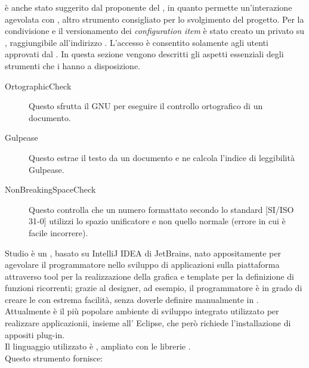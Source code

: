 		 è anche stato suggerito dal proponente del , in quanto permette un'interazione agevolata con , altro strumento consigliato per lo svolgimento del progetto. 
			Per la condivisione e il versionamento dei \textit{configuration item} è stato creato un  privato su , raggiungibile all’indirizzo . L’accesso è consentito solamente agli utenti approvati dal .
		In questa sezione vengono descritti gli aspetti essenziali degli strumenti che i  hanno a disposizione.
		\begin{description}
			\item[OrtographicCheck] Questo  sfrutta il  GNU  per eseguire il controllo ortografico di un documento.
			\item[Gulpease] Questo  estrae il testo da un documento e ne calcola l'indice di leggibilità Gulpease.
			\item[NonBreakingSpaceCheck] Questo  controlla che un numero formattato secondo lo standard [SI/ISO 31-0] utilizzi lo spazio unificatore e non quello normale (errore in cui è facile incorrere).
		\end{description}
		 Studio è un , basato su IntelliJ IDEA di JetBrains, nato appositamente per agevolare il programmatore nello sviluppo di applicazioni sulla piattaforma  attraverso tool per la realizzazione della grafica e template per la definizione di funzioni ricorrenti; grazie al designer, ad esempio, il programmatore è in grado di creare le  con estrema facilità,  senza doverle definire manualmente in .\\
		Attualmente è il più popolare ambiente di sviluppo integrato utilizzato per realizzare applicazionii, insieme all' Eclipse, che però richiede l'installazione di appositi plug-in.\\ 
		Il linguaggio utilizzato è , ampliato con le librerie .\\
		Questo strumento fornisce:
